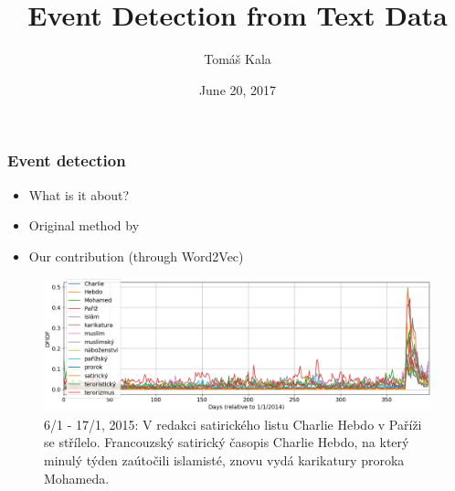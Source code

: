 \documentclass{beamer}
\title{Event Detection from Text Data}
\author{Tom\'a\v{s} Kala}
\date{June 20, 2017}
\begin{document}
\frame{\titlepage}

\begin{frame}
\frametitle{Event detection}


\begin{itemize}
\item What is it about?
\item Original method by \cite{event-detection}
\item Our contribution (through Word2Vec)
\end{itemize}

\begin{figure}

\centering
\includegraphics[width=\linewidth,height=\textheight,keepaspectratio]{charlie_hebdo}
\caption{6/1 - 17/1, 2015: V redakci satirick\'eho listu Charlie Hebdo v Pa\v{r}\'i\v{z}i se st\v{r}\'ilelo. Francouzsk\'y satirick\'y \v{c}asopis Charlie Hebdo, na kter\'y minul\'y t\'yden za\'uto\v{c}ili islamist\'e, znovu vyd\'a karikatury proroka Mohameda.}
\end{figure}


\end{frame}
\end{document}

